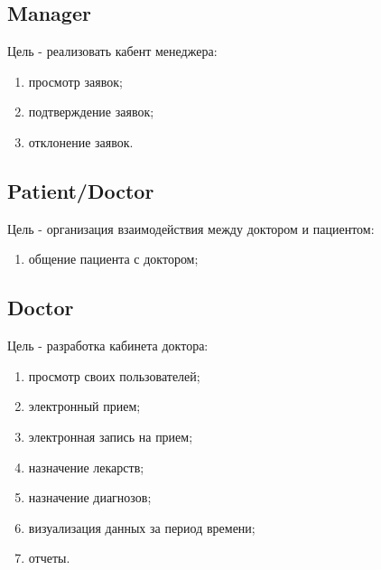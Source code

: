 \subsection{Manager}
Цель - реализовать кабент менеджера:
\begin{enumerate}
  \item просмотр заявок;
  \item подтверждение заявок;
  \item отклонение заявок.   
\end{enumerate}

\subsection{Patient/Doctor}
Цель - организация взаимодействия между доктором и пациентом:
\begin{enumerate}
  \item общение пациента с доктором;
\end{enumerate}

\subsection{Doctor}
Цель - разработка кабинета доктора:
\begin{enumerate}
  \item просмотр своих пользователей;
  \item электронный прием;
  \item электронная запись на прием;
  \item назначение лекарств;
  \item назначение диагнозов;
  \item визуализация данных за период времени;
  \item отчеты.
\end{enumerate}

